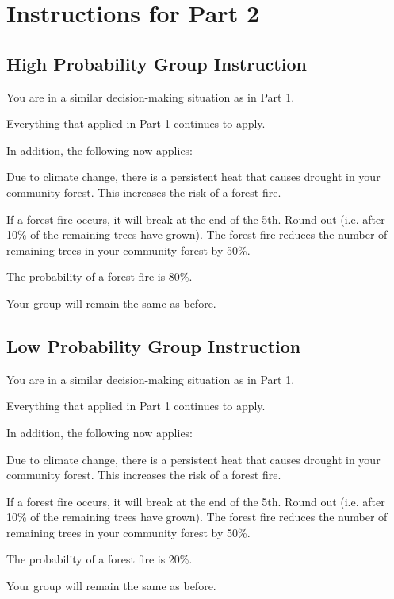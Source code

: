 \setlength{\parskip}{1em}
\section*{Instructions for Part 2}
\subsection*{High Probability Group Instruction}

You are in a similar decision-making situation as in Part 1.

\noindent Everything that applied in Part 1 continues to apply.

\noindent In addition, the following now applies:

\noindent Due to climate change, there is a persistent heat that causes drought in your community forest. This increases the risk of a forest fire.

\noindent If a forest fire occurs, it will break at the end of the 5th. Round out (i.e. after 10\% of the remaining trees have grown). The forest fire reduces the number of remaining trees in your community forest by 50\%.

\noindent The probability of a forest fire is 80\%.

\noindent Your group will remain the same as before.


\subsection*{Low Probability Group Instruction}

\noindent You are in a similar decision-making situation as in Part 1.

\noindent Everything that applied in Part 1 continues to apply.

\noindent In addition, the following now applies:

\noindent Due to climate change, there is a persistent heat that causes drought in your community forest. This increases the risk of a forest fire.

\noindent If a forest fire occurs, it will break at the end of the 5th. Round out (i.e. after 10\% of the remaining trees have grown). The forest fire reduces the number of remaining trees in your community forest by 50\%.

\noindent The probability of a forest fire is 20\%.

\noindent Your group will remain the same as before.
